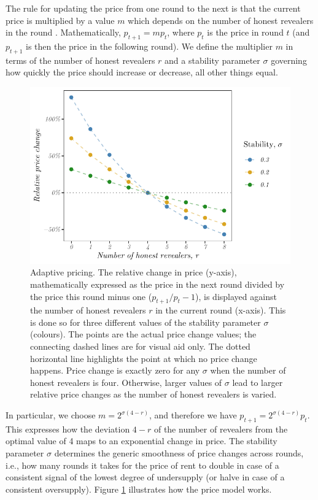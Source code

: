 The rule for updating the price from one round to the next is that the current price is multiplied by a value $m$ which depends on the number of honest revealers in the round%
. Mathematically, $p_{t+1} = m p_t$, where $p_t$ is the price in round $t$ (and $p_{t+1}$ is then the price in the following round). We define the multiplier $m$ in terms of the number of honest revealers $r$ and a stability parameter $\sigma$ governing how quickly the price should increase or decrease, all other things equal. 

\begin{figure}[!ht]
  \centering
  \includegraphics[width=.7\textwidth]{fig/adaptive-pricing.pdf}
  \caption[Adaptive pricing]{Adaptive pricing. The relative change in price (y-axis), mathematically expressed as the price in the next round divided by the price this round minus one ($p_{t+1} / p_t - 1$), is displayed against the number of honest revealers $r$ in the current round (x-axis). This is done so for three different values of the stability parameter $\sigma$ (colours). The points are the actual price change values; the connecting dashed lines are for visual aid only. The dotted horizontal line highlights the point at which no price change happens. Price change is exactly zero for any $\sigma$ when the number of honest revealers is four. Otherwise, larger values of $\sigma$ lead to larger relative price changes as the number of honest revealers is varied.}
  \label{fig:adaptive-pricing}
\end{figure}

In particular, we choose $m = 2^{\sigma(4 - r)}$, and therefore we have $p_{t+1} = 2^{\sigma(4 - r)} p_t$. This expresses how the deviation $4 - r$ of the number of revealers from the optimal value of 4 maps to an exponential change in price. The stability parameter $\sigma$ determines the generic smoothness of price changes across rounds, i.e., how many rounds it takes for the price of rent to double in case of a consistent signal of the lowest degree of undersupply (or halve in case of a consistent oversupply). Figure \ref{fig:adaptive-pricing} illustrates how the price model works.

